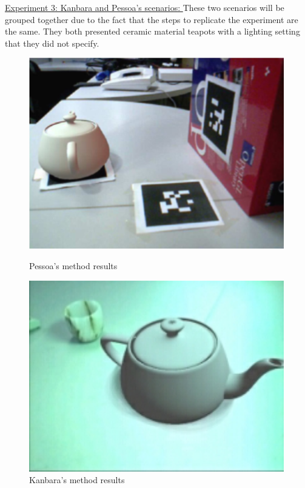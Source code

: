 \underline{Experiment 3: Kanbara and Pessoa's scenarios: } These two scenarios will be grouped together due to the fact that the steps to replicate the experiment are the same. They both presented ceramic material teapots with a lighting setting that they did not specify. 
\begin{figure}[H]
    \centering
    \begin{minipage}{0.5\textwidth}
        \centering
        \includegraphics[width=0.99\textwidth]{Figures/Pessoa.png} %
        \caption{Pessoa's method results}
    \end{minipage}\hfill
    \begin{minipage}{0.5\textwidth}
        \centering
        \includegraphics[width=0.99\textwidth]{Figures/kanbara.png} %
        \caption{Kanbara's method results}
    \end{minipage}\hfill
\end{figure}


